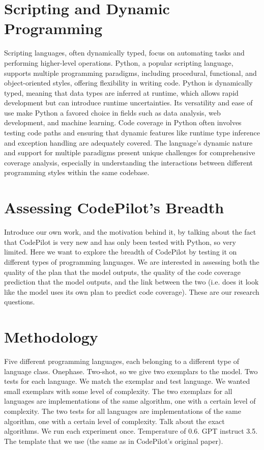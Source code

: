 \documentclass[sigconf]{acmart}
\begin{document}
\section{Scripting and Dynamic Programming}
Scripting languages, often dynamically typed, focus on automating tasks and performing higher-level operations. Python, a popular scripting language, supports multiple programming paradigms, including procedural, functional, and object-oriented styles, offering flexibility in writing code. Python is dynamically typed, meaning that data types are inferred at runtime, which allows rapid development but can introduce runtime uncertainties. Its versatility and ease of use make Python a favored choice in fields such as data analysis, web development, and machine learning. Code coverage in Python often involves testing code paths and ensuring that dynamic features like runtime type inference and exception handling are adequately covered. The language’s dynamic nature and support for multiple paradigms present unique challenges for comprehensive coverage analysis, especially in understanding the interactions between different programming styles within the same codebase.

\section{Assessing CodePilot's Breadth}
Introduce our own work, and the motivation behind it, by talking about the fact that CodePilot is very new and has only been tested with Python, so very limited. Here we want to explore the breadth of CodePilot by testing it on different types of programming languages. We are interested in assessing both the quality of the plan that the model outputs, the quality of the code coverage prediction that the model outputs, and the link between the two (i.e. does it look like the model uses its own plan to predict code coverage). These are our research questions.

\section{Methodology}
Five different programming languages, each belonging to a different type of language class. Onephase. Two-shot, so we give two exemplars to the model. Two tests for each language. We match the exemplar and test language. We wanted small exemplars with some level of complexity. The two exemplars for all languages are implementations of the same algorithm, one with a certain level of complexity. The two tests for all languages are implementations of the same algorithm, one with a certain level of complexity. Talk about the exact algorithms. We run each experiment once. Temperature of 0.6. GPT instruct 3.5. The template that we use (the same as in CodePilot's original paper).
\end{document}
